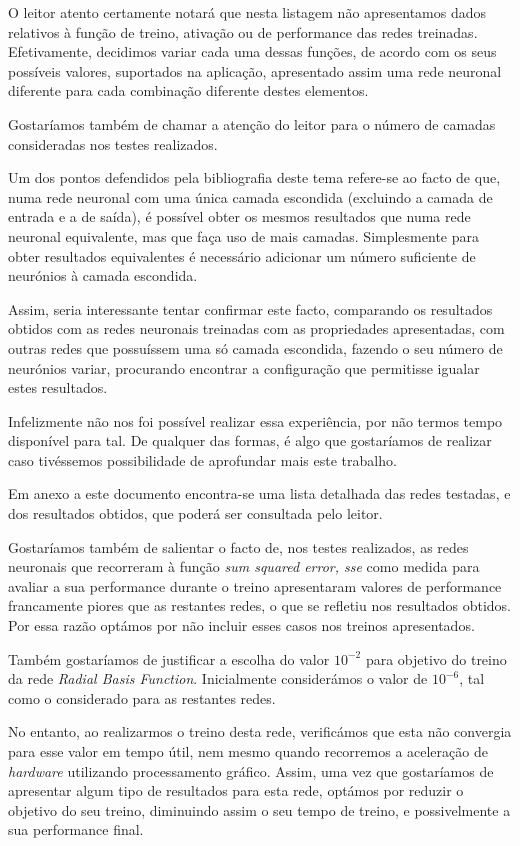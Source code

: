 \documentclass{article}
\begin{document}
O leitor atento certamente notará que nesta listagem não apresentamos dados relativos à função de treino, ativação ou de performance das redes treinadas. Efetivamente, decidimos variar cada uma dessas funções, de acordo com os seus possíveis valores, suportados na aplicação, apresentado assim uma rede neuronal diferente para cada combinação diferente destes elementos.

Gostaríamos também de chamar a atenção do leitor para o número de camadas consideradas nos testes realizados.

Um dos pontos defendidos pela bibliografia deste tema refere-se ao facto de que, numa rede neuronal com uma única camada escondida (excluindo a camada de entrada e a de saída), é possível obter os mesmos resultados que numa rede neuronal equivalente, mas que faça uso de mais camadas. Simplesmente para obter resultados equivalentes é necessário adicionar um número suficiente de neurónios à camada escondida.

Assim, seria interessante tentar confirmar este facto, comparando os resultados obtidos com as redes neuronais treinadas com as propriedades apresentadas, com outras redes que possuíssem uma só camada escondida, fazendo o seu número de neurónios variar, procurando encontrar a configuração que permitisse igualar estes resultados.

Infelizmente não nos foi possível realizar essa experiência, por não termos tempo disponível para tal. De qualquer das formas, é algo que gostaríamos de realizar caso tivéssemos possibilidade de aprofundar mais este trabalho.

Em anexo a este documento encontra-se uma lista detalhada das redes testadas, e dos resultados obtidos, que poderá ser consultada pelo leitor.

Gostaríamos também de salientar o facto de, nos testes realizados, as redes neuronais que recorreram à função \emph{sum squared error, sse} como medida para avaliar a sua performance durante o treino apresentaram valores de performance francamente piores que as restantes redes, o que se refletiu nos resultados obtidos. Por essa razão optámos por não incluir esses casos nos treinos apresentados.

Também gostaríamos de justificar a escolha do valor $10^{-2}$ para objetivo do treino da rede \emph{Radial Basis Function}. Inicialmente considerámos o valor de $10^{-6}$, tal como o considerado para as restantes redes.

No entanto, ao realizarmos o treino desta rede, verificámos que esta não convergia para esse valor em tempo útil, nem mesmo quando recorremos a aceleração de \emph{hardware} utilizando processamento gráfico. Assim, uma vez que gostaríamos de apresentar algum tipo de resultados para esta rede, optámos por reduzir o objetivo do seu treino, diminuindo assim o seu tempo de treino, e possivelmente a sua performance final.
\end{document}
